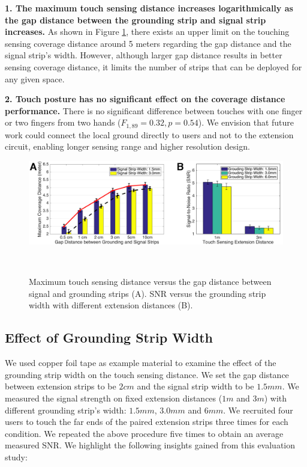 \textbf{1. The maximum touch sensing distance increases logarithmically as the gap distance between the grounding strip and signal strip increases.} As shown in Figure \ref{fig:ground-effect}, there exists an upper limit on the touching sensing coverage distance around 5 meters regarding the gap distance and the signal strip's width. However, although larger gap distance results in better sensing coverage distance, it limits the number of strips that can be deployed for any given space.

\textbf{2. Touch posture has no significant effect on the coverage distance performance.} There is no significant difference between touches with one finger or two fingers from two hands ($F_{1,89} = 0.32, p = 0.54$). We envision that future work could connect the local ground directly to users and not to the extension circuit, enabling longer sensing range and higher resolution design.


\begin{figure}[ht]
\centering
  \includegraphics[width=0.7\columnwidth]{figures/grouding-gap-and-width.png}
  \setlength{\belowcaptionskip}{-8pt}
  \caption{Maximum touch sensing distance versus the gap distance between signal and grounding strips (A). SNR versus the grounding strip width with different extension distances (B).}~\label{fig:ground-effect}
\end{figure}

\subsection{Effect of Grounding Strip Width}

We used copper foil tape as example material to examine the effect of the grounding strip width on the touch sensing distance. We set the gap distance between extension strips to be $2 cm$ and the signal strip width to be $1.5 mm$. We measured the signal strength on fixed extension distances ($1m$ and $3m$) with different grounding strip's width: $1.5 mm$, $3.0 mm$ and $6 mm$. We recruited four users to touch the far ends of the paired extension strips three times for each condition. We repeated the above procedure five times to obtain an average measured SNR. We highlight the following insights gained from this evaluation study:


